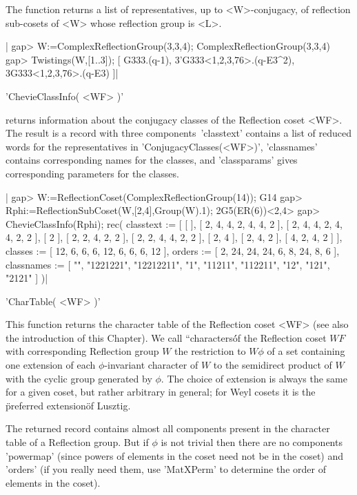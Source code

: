 The  function returns  a list  of representatives,  up to <W>-conjugacy, of
reflection sub-cosets of <W> whose reflection group is <L>.

|    gap> W:=ComplexReflectionGroup(3,3,4);
    ComplexReflectionGroup(3,3,4)
    gap> Twistings(W,[1..3]);
    [ G333.(q-1), 3'G333<1,2,3,76>.(q-E3^2), 3G333<1,2,3,76>.(q-E3) ]|


'ChevieClassInfo( <WF> )'

returns  information about  the conjugacy  classes of  the Reflection coset
<WF>.  The result is a record with three components\:\ 'classtext' contains
a list of reduced words for the representatives in
'ConjugacyClasses(<WF>)', 'classnames' contains corresponding names for the
classes, and 'classparams' gives corresponding parameters for the classes.

|    gap> W:=ReflectionCoset(ComplexReflectionGroup(14));
    G14
    gap> Rphi:=ReflectionSubCoset(W,[2,4],Group(W).1);
    2G5(ER(6))<2,4>
    gap> ChevieClassInfo(Rphi);
    rec(
      classtext :=
       [ [  ], [ 2, 4, 4, 2, 4, 4, 2 ], [ 2, 4, 4, 2, 4, 4, 2, 2 ],
          [ 2 ], [ 2, 2, 4, 2, 2 ], [ 2, 2, 4, 4, 2, 2 ], [ 2, 4 ],
          [ 2, 4, 2 ], [ 4, 2, 4, 2 ] ],
      classes := [ 12, 6, 6, 6, 12, 6, 6, 6, 12 ],
      orders := [ 2, 24, 24, 24, 6, 8, 24, 8, 6 ],
      classnames := [ "", "1221221", "12212211", "1", "11211", "112211",
          "12", "121", "2121" ] )|


'CharTable(  <WF> )'

This function returns the character table of the Reflection coset <WF> (see
also  the introduction  of this  Chapter). We  call ``characters\'\' of the
Reflection   coset  $WF$  with  corresponding   Reflection  group  $W$  the
restriction  to  $W  \phi$  of  a  set  containing  one  extension  of each
$\phi$-invariant character of $W$ to the semidirect product of $W$ with the
cyclic  group generated  by $\phi$.  The choice  of extension is always the
same for a given coset, but rather arbitrary in general; for Weyl cosets it
is the \"preferred extension\" of Lusztig.

The returned record contains almost all components present in the character
table of a Reflection group. But if $\phi$ is not trivial then there are no
components 'powermap' (since powers of elements in the coset need not be in
the  coset)  and  'orders'  (if  you  really  need  them, use 'MatXPerm' to
determine the order of elements in the coset).

